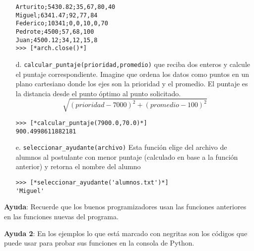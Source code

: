 \begin{itemize}
\begin{lstlisting}[style=consola]
Arturito;5430.82;35,67,80,40
Miguel;6341.47;92,77,84
Federico;10341;0,0,10,0,70
Pedrote;4500;57,68,100
Juan;4500.12;34,12,15,8
>>> [*arch.close()*]
    \end{lstlisting}
    \item[d.] \texttt{calcular\_puntaje(prioridad,promedio)} que reciba dos enteros y calcule el puntaje correspondiente. Imagine que ordena los datos como puntos en un plano cartesiano donde los ejes son la prioridad y el promedio. El puntaje es la distancia desde el punto óptimo al punto solicitado.
    \begin{displaymath}
    \sqrt{(prioridad-7000)^{2}+(promedio-100)^{2}}
    \end{displaymath}
    \begin{lstlisting}[style=consola]
>>> [*calcular_puntaje(7900.0,70.0)*]
900.4998611882181
    \end{lstlisting}
    \item[e.] \texttt{seleccionar\_ayudante(archivo)} Esta función elige del archivo de alumnos al postulante con menor puntaje (calculado en base a la función anterior) y retorna el nombre del alumno
    \begin{lstlisting}[style=consola]
>>> [*seleccionar_ayudante('alumnos.txt')*]
'Miguel'
    \end{lstlisting}
\end{itemize}

\textbf{Ayuda}: Recuerde que los buenos programizadores usan las funciones anteriores en las funciones nuevas del programa. 

\textbf{Ayuda 2}: En los ejemplos lo que está marcado con negritas son los códigos que puede usar para probar sus funciones en la consola de Python.